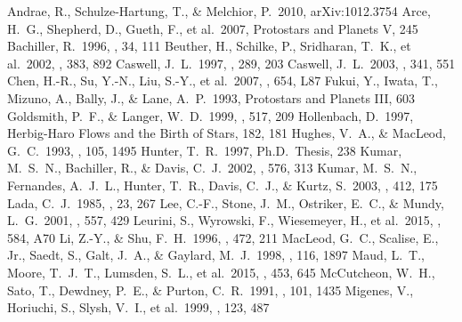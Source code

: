 \documentclass[preprint2]{aastex}
\begin{document}
\begin{thebibliography}{}
 Andrae, R., Schulze-Hartung, T., \& Melchior, P.\ 2010, arXiv:1012.3754
 Arce, H.~G., Shepherd, D., Gueth, F., et al.\ 2007, Protostars and Planets V, 245 
 Bachiller, R.\ 1996, \araa, 34, 111 
 Beuther, H., Schilke, P., Sridharan, T.~K., et al.\ 2002, \aap, 383, 892
 Caswell, J.~L.\ 1997, \mnras, 289, 203 
 Caswell, J.~L.\ 2003, \mnras, 341, 551 
 Chen, H.-R., Su, Y.-N., Liu, S.-Y., et al.\ 2007, \apjl, 654, L87 
 Fukui, Y., Iwata, T., Mizuno, A., Bally, J., \& Lane, A.~P.\ 1993, Protostars and Planets III, 603
 Goldsmith, P.~F., \& Langer, W.~D.\ 1999, \apj, 517, 209 
 Hollenbach, D.\ 1997, Herbig-Haro Flows and the Birth of Stars, 182, 181 
 Hughes, V.~A., \& MacLeod, G.~C.\ 1993, \aj, 105, 1495
 Hunter, T.~R.\ 1997, Ph.D.~Thesis, 238 
 Kumar, M.~S.~N., Bachiller, R., \& Davis, C.~J.\ 2002, \apj, 576, 313 
 Kumar, M.~S.~N., Fernandes, A.~J.~L., Hunter, T.~R., Davis, C.~J., \& Kurtz, S.\ 2003, \aap, 412, 175 
 Lada, C.~J.\ 1985, \araa, 23, 267 
 Lee, C.-F., Stone, J.~M., Ostriker, E.~C., \& Mundy, L.~G.\ 2001, \apj, 557, 429 
 Leurini, S., Wyrowski, F., Wiesemeyer, H., et al.\ 2015, \aap, 584, A70 
 Li, Z.-Y., \& Shu, F.~H.\ 1996, \apj, 472, 211
 MacLeod, G.~C., Scalise, E., Jr., Saedt, S., Galt, J.~A., \& Gaylard, M.~J.\ 1998, \aj, 116, 1897 
 Maud, L.~T., Moore, T.~J.~T., Lumsden, S.~L., et al.\ 2015, \mnras, 453, 645
 McCutcheon, W.~H., Sato, T., Dewdney, P.~E., \& Purton, C.~R.\ 1991, \aj, 101, 1435 
 Migenes, V., Horiuchi, S., Slysh, V.~I., et al.\ 1999, \apjs, 123, 487

\end{thebibliography}
\end{document}
